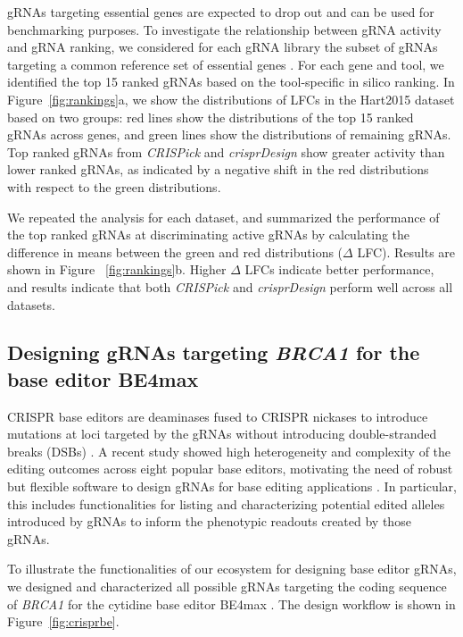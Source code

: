 \documentclass[pdftex,english,10pt]{article}
\begin{document}
gRNAs targeting essential genes are expected to drop out and can be used for benchmarking purposes. 
To investigate the relationship between gRNA activity and gRNA ranking, we considered for each gRNA library the subset of gRNAs targeting a common reference set of essential genes \citep{hart2014}. For each gene and tool, we identified the top 15 ranked gRNAs based on the tool-specific in silico ranking. In Figure~\ref{fig:rankings}a, we show the distributions of LFCs in the Hart2015 dataset based on two groups: red lines show the distributions of the top 15 ranked gRNAs across genes, and green lines show the distributions of remaining gRNAs. Top ranked gRNAs from \textit{CRISPick} and \textit{crisprDesign} show greater activity than lower ranked gRNAs, as indicated by a negative shift in the red distributions with respect to the green distributions. 

We repeated the analysis for each dataset, and summarized the performance of the top ranked gRNAs at discriminating active gRNAs by calculating the difference in means between the green and red distributions ($\Delta$ LFC). Results are shown in Figure ~\ref{fig:rankings}b. Higher $\Delta$ LFCs indicate better performance, and results indicate that both \textit{CRISPick} and \textit{crisprDesign} perform well across all datasets.



\subsection*{Designing gRNAs targeting \textit{BRCA1} for the base editor BE4max} 

CRISPR base editors are deaminases fused to CRISPR nickases to introduce mutations at loci targeted by the gRNAs without introducing double-stranded breaks (DSBs) \citep{gaudelli,komor}. A recent study showed high heterogeneity and complexity of the editing outcomes across eight popular base editors, motivating the need of robust but flexible software to design gRNAs for base editing applications \citep{behive}. In particular, this includes functionalities for listing and characterizing potential edited alleles introduced by gRNAs to inform the phenotypic readouts created by those gRNAs.

To illustrate the functionalities of our ecosystem for designing base editor gRNAs, we designed and characterized all possible gRNAs targeting the coding sequence of \textit{BRCA1} for the cytidine base editor BE4max \citep{koblan2018improving}. The design workflow is shown in Figure~\ref{fig:crisprbe}. 
\end{document}
